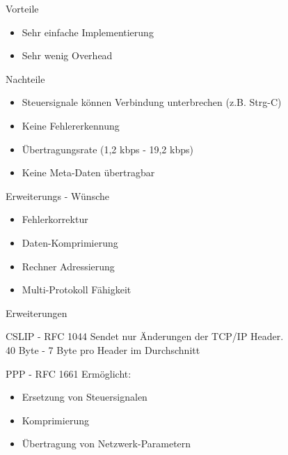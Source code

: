 \documentclass[beamer]{uibk}
\begin{document}
\begin{frame}{}
    \begin{block}{Vorteile}
      \begin{itemize}
        \item Sehr einfache Implementierung
        \item Sehr wenig Overhead
      \end{itemize}
    \end{block}

    \begin{alertblock}{Nachteile}
      \begin{itemize}
        \item Steuersignale können Verbindung unterbrechen (z.B. Strg-C)
        \item Keine Fehlererkennung
        \item Übertragungsrate (1,2 kbps - 19,2 kbps)
        \item Keine Meta-Daten übertragbar
      \end{itemize}
    \end{alertblock}

\end{frame}

\begin{frame}{Erweiterungs - Wünsche}
  \begin{itemize}
    \item Fehlerkorrektur
    \item Daten-Komprimierung
    \item Rechner Adressierung
    \item Multi-Protokoll Fähigkeit
  \end{itemize}
\end{frame}

\begin{frame}{Erweiterungen}
  \begin{block}{CSLIP - RFC 1044}
    Sendet nur Änderungen der TCP/IP Header. \\
    40 Byte - 7 Byte pro Header im Durchschnitt
  \end{block}
  \begin{block}{PPP - RFC 1661}
    Ermöglicht:
    \begin{itemize}
      \item Ersetzung von Steuersignalen
      \item Komprimierung
      \item Übertragung von Netzwerk-Parametern
    \end{itemize}
    
  \end{block}

\end{frame}
\end{document}
